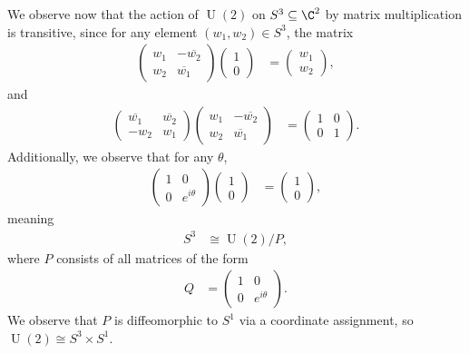 \documentclass[10pt]{mypackage}
\begin{document}
\begin{solution}
\begin{enumerate}[(a)]
      We observe now that the action of $\operatorname{U}(2)$ on $S^{3}\subseteq \C^{2}$ by matrix multiplication is transitive, since for any element $\left( w_1,w_2 \right)\in S^{3}$, the matrix
      \begin{align*}
        \begin{pmatrix}w_1 & - \overline{w_2} \\ w_2 & \overline{w_1}\end{pmatrix} \begin{pmatrix}1\\0\end{pmatrix} &= \begin{pmatrix}w_1\\w_2\end{pmatrix},
      \end{align*}
      and
      \begin{align*}
        \begin{pmatrix} \overline{w_1} & \overline{w_2} \\ -w_2 & w_1\end{pmatrix} \begin{pmatrix}w_1 & - \overline{w_2} \\ w_2 & \overline{w_1}\end{pmatrix} &= \begin{pmatrix}1 & 0 \\ 0 & 1\end{pmatrix}.
      \end{align*}
      Additionally, we observe that for any $\theta$,
      \begin{align*}
        \begin{pmatrix}1 & 0 \\ 0 & e^{i\theta}\end{pmatrix} \begin{pmatrix}1\\0\end{pmatrix} &= \begin{pmatrix}1\\0\end{pmatrix},
      \end{align*}
      meaning 
      \begin{align*}
        S^{3} &\cong \operatorname{U}(2)/ P,
      \end{align*}
      where $P$ consists of all matrices of the form
      \begin{align*}
        Q &= \begin{pmatrix}1 & 0 \\ 0 & e^{i\theta}\end{pmatrix}.
      \end{align*}
      We observe that $P$ is diffeomorphic to $S^{1}$ via a coordinate assignment, so $\operatorname{U}(2)\cong S^{3}\times S^{1}$.
  \end{enumerate}
\end{solution}
\end{document}
